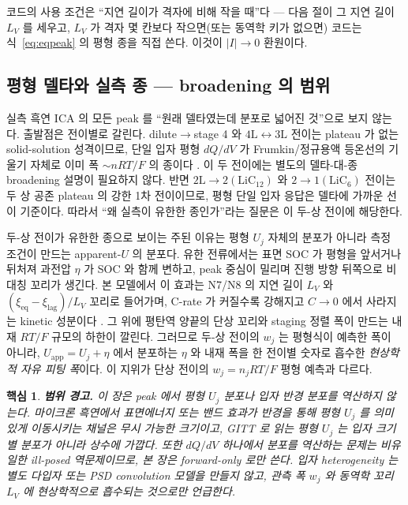 \documentclass[11pt,a4paper]{article}
\newtheorem*{keybox}{핵심}
\newcommand{\eq}{\mathrm{eq}}
\begin{document}
코드의 사용 조건은 ``지연 길이가 격자에 비해 작을 때''다 — 다음 절이 그 지연 길이 $L_V$ 를 세우고, $L_V$ 가 격자
몇 칸보다 작으면(또는 동역학 키가 없으면) 코드는 식~\eqref{eq:eqpeak} 의 평형 종을 직접 쓴다. 이것이 $|I|\to0$ 환원이다.

\subsection{평형 델타와 실측 종 — broadening 의 범위}\label{sec:broadening}
실측 흑연 ICA 의 모든 peak 를 ``원래 델타였는데 분포로 넓어진 것''으로 보지 않는다. 출발점은 전이별로 갈린다.
dilute$\to$stage 4 와 $4\mathrm L\leftrightarrow3\mathrm L$ 전이는 plateau 가 없는 solid-solution 성격이므로,
단일 입자 평형 $dQ/dV$ 가 Frumkin/정규용액 등온선의 기울기 자체로 이미 폭 $\sim nRT/F$ 의 종이다
\cite{levi1999,rsc2021}. 이 두 전이에는 별도의 델타-대-종 broadening 설명이 필요하지 않다. 반면
$2\mathrm L\to2(\mathrm{LiC}_{12})$ 와 $2\to1(\mathrm{LiC}_6)$ 전이는 두 상 공존 plateau 의 강한 1차 전이이므로,
평형 단일 입자 응답은 델타에 가까운 선이 기준이다. 따라서 ``왜 실측이 유한한 종인가''라는 질문은 이 두-상 전이에
해당한다.

두-상 전이가 유한한 종으로 보이는 주된 이유는 평형 $U_j$ 자체의 분포가 아니라 측정 조건이 만드는 apparent-$U$ 의
분포다. 유한 전류에서는 표면 SOC 가 평형을 앞서거나 뒤처져 과전압 $\eta$ 가 SOC 와 함께 변하고, peak 중심이 밀리며
진행 방향 뒤쪽으로 비대칭 꼬리가 생긴다. 본 모델에서 이 효과는 N7/N8 의 지연 길이 $L_V$ 와
$(\xi_\eq-\xi_\mathrm{lag})/L_V$ 꼬리로 들어가며, C-rate 가 커질수록 강해지고 $C\to0$ 에서 사라지는 kinetic 성분이다
\cite{fly2020}. 그 위에 평탄역 양끝의 단상 꼬리와 staging 정렬 폭이 만드는 내재 $RT/F$ 규모의 하한이 깔린다. 그러므로
두-상 전이의 $w_j$ 는 평형식이 예측한 폭이 아니라, $U_\mathrm{app}=U_j+\eta$ 에서 분포하는 $\eta$ 와 내재 폭을 한
전이별 숫자로 흡수한 \emph{현상학적 자유 피팅 폭}이다. 이 지위가 단상 전이의 $w_j=n_jRT/F$ 평형 예측과 다르다.

\begin{keybox}
\textbf{범위 경고.} 이 장은 peak 에서 평형 $U_j$ 분포나 입자 반경 분포를 역산하지 않는다. 마이크론 흑연에서 표면에너지
또는 밴드 효과가 반경을 통해 평형 $U_j$ 를 의미 있게 이동시키는 채널은 무시 가능한 크기이고, GITT 로 읽는 평형
$U_j$ 는 입자 크기별 분포가 아니라 상수에 가깝다\cite{cogswell2012,park2021}. 또한 $dQ/dV$ 하나에서 분포를 역산하는
문제는 비유일한 ill-posed 역문제이므로, 본 장은 forward-only 로만 쓴다. 입자 heterogeneity 는 별도 다입자 또는
PSD convolution 모델을 만들지 않고, 관측 폭 $w_j$ 와 동역학 꼬리 $L_V$ 에 현상학적으로 흡수되는 것으로만 언급한다.
\end{keybox}
\end{document}
